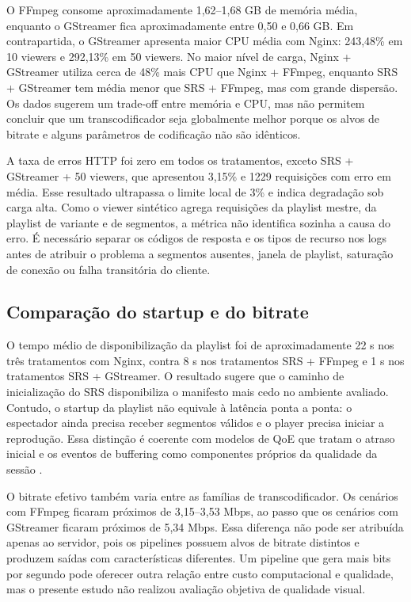 O FFmpeg consome aproximadamente 1,62--1,68 GB de memória média, enquanto o GStreamer fica aproximadamente entre 0,50 e 0,66 GB. Em contrapartida, o GStreamer apresenta maior CPU média com Nginx: 243,48\% em 10 viewers e 292,13\% em 50 viewers. No maior nível de carga, Nginx + GStreamer utiliza cerca de 48\% mais CPU que Nginx + FFmpeg, enquanto SRS + GStreamer tem média menor que SRS + FFmpeg, mas com grande dispersão. Os dados sugerem um trade-off entre memória e CPU, mas não permitem concluir que um transcodificador seja globalmente melhor porque os alvos de bitrate e alguns parâmetros de codificação não são idênticos.

A taxa de erros HTTP foi zero em todos os tratamentos, exceto SRS + GStreamer + 50 viewers, que apresentou 3,15\% e 1229 requisições com erro em média. Esse resultado ultrapassa o limite local de 3\% e indica degradação sob carga alta. Como o viewer sintético agrega requisições da playlist mestre, da playlist de variante e de segmentos, a métrica não identifica sozinha a causa do erro. É necessário separar os códigos de resposta e os tipos de recurso nos logs antes de atribuir o problema a segmentos ausentes, janela de playlist, saturação de conexão ou falha transitória do cliente.

\subsection{Comparação do startup e do bitrate}

O tempo médio de disponibilização da playlist foi de aproximadamente 22 s nos três tratamentos com Nginx, contra 8 s nos tratamentos SRS + FFmpeg e 1 s nos tratamentos SRS + GStreamer. O resultado sugere que o caminho de inicialização do SRS disponibiliza o manifesto mais cedo no ambiente avaliado. Contudo, o startup da playlist não equivale à latência ponta a ponta: o espectador ainda precisa receber segmentos válidos e o player precisa iniciar a reprodução. Essa distinção é coerente com modelos de QoE que tratam o atraso inicial e os eventos de buffering como componentes próprios da qualidade da sessão \citep{itu1203}.

O bitrate efetivo também varia entre as famílias de transcodificador. Os cenários com FFmpeg ficaram próximos de 3,15--3,53 Mbps, ao passo que os cenários com GStreamer ficaram próximos de 5,34 Mbps. Essa diferença não pode ser atribuída apenas ao servidor, pois os pipelines possuem alvos de bitrate distintos e produzem saídas com características diferentes. Um pipeline que gera mais bits por segundo pode oferecer outra relação entre custo computacional e qualidade, mas o presente estudo não realizou avaliação objetiva de qualidade visual.

